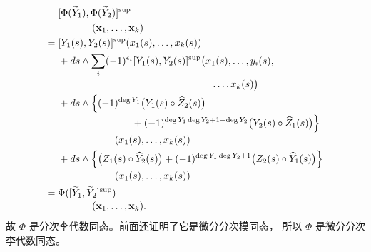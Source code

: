 \[
\begin{aligned}
 &[\Phi(\widetilde Y_1),\Phi(\widetilde Y_2)]^{\mathrm{sup}}\\
 &\hspace{12mm}{}
   (\mathbf x_1,\ldots,\mathbf x_k)\\
={}&[Y_1(s),Y_2(s)]^{\mathrm{sup}}(x_1(s),\ldots,x_k(s))\\
 &+ds\wedge\sum_i(-1)^{\epsilon_i}
   [Y_1(s),Y_2(s)]^{\mathrm{sup}}
   \bigl(x_1(s),\ldots,y_i(s),\\[-2pt]
 &\hspace{54mm}{}\ldots,x_k(s)\bigr)\\
 &+ds\wedge\Bigl\{
   (-1)^{\deg Y_1}\bigl(Y_1(s)\circ\widehat Z_2(s)\bigr)
   \\[-2pt]
 &\hspace{26mm}{}
   +(-1)^{\deg Y_1\deg Y_2+1+\deg Y_2}
    \bigl(Y_2(s)\circ\widehat Z_1(s)\bigr)
   \Bigr\}\\[-2pt]
 &\hspace{20mm}{}(x_1(s),\ldots,x_k(s))\\
 &+ds\wedge\Bigl\{
   \bigl(Z_1(s)\circ\widehat Y_2(s)\bigr)
   +(-1)^{\deg Y_1\deg Y_2+1}
    \bigl(Z_2(s)\circ\widehat Y_1(s)\bigr)
   \Bigr\}\\[-2pt]
 &\hspace{20mm}{}(x_1(s),\ldots,x_k(s))\\
={}&\Phi([\widetilde Y_1,\widetilde Y_2]^{\mathrm{sup}})\\[-2pt]
 &\hspace{12mm}{}(\mathbf x_1,\ldots,\mathbf x_k).
\end{aligned}
\]
\endgroup
故 $\Phi$ 是分次李代数同态。前面还证明了它是微分分次模同态，
所以 $\Phi$ 是微分分次李代数同态。
